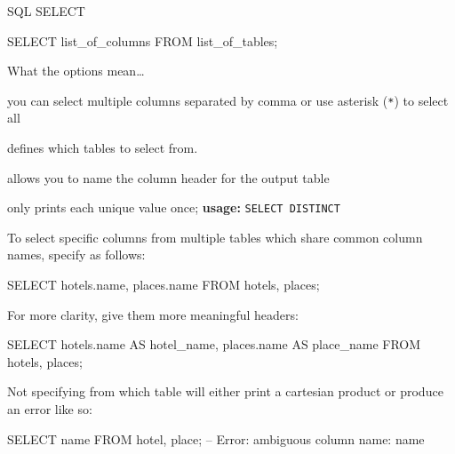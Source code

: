 \begin{frame}{SQL SELECT}
\begin{sqlcode}
SELECT list_of_columns FROM list_of_tables;
\end{sqlcode}
\begin{exampleblock}{What the options mean\dots}
\begin{description}\footnotesize
  \item[list\_of\_columns] you can select multiple columns separated by comma or use asterisk (\texttt{*}) to select all
  \item[list\_of\_tables] defines which tables to select from. 
  \item[AS (alias)] allows you to name the column header for the output table
  \item[DISTINCT] only prints each unique value once; \textbf{usage:} \texttt{SELECT DISTINCT}
\end{description}
\end{exampleblock}

\framebreak
\small 
To select specific columns from multiple tables which share common column names, specify as follows:
\begin{sqlcode}
SELECT hotels.name, places.name FROM hotels, places;
\end{sqlcode}
For more clarity, give them more meaningful headers:
\begin{sqlcode}
SELECT hotels.name AS hotel_name, 
       places.name AS place_name 
FROM hotels, places;
\end{sqlcode}
Not specifying from which table will either print a cartesian product or produce an error like so:
\begin{sqlcode}
SELECT name FROM hotel, place;
-- Error: ambiguous column name: name
\end{sqlcode}

\end{frame}



